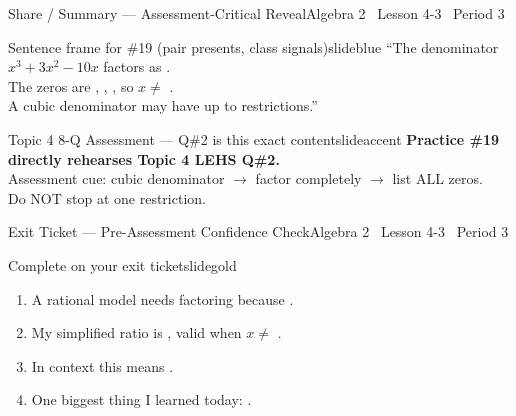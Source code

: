 \documentclass[aspectratio=169, 11pt]{beamer}
\begin{document}
\begin{frame}{Share / Summary --- Assessment-Critical Reveal}{Algebra 2 \textperiodcentered\ Lesson 4-3 \textperiodcentered\ Period 3}
\vspace{0.15cm}
\begin{projcard}{Sentence frame for \#19 (pair presents, class signals)}{slideblue}
``The denominator \(x^3+3x^2-10x\) factors as \underline{\hspace{2.5cm}}.\\
The zeros are \underline{\hspace{1cm}}, \underline{\hspace{1cm}}, \underline{\hspace{1cm}}, so \(x \ne\) \underline{\hspace{2.5cm}}.\\
A cubic denominator may have up to \underline{\hspace{0.6cm}} restrictions.''
\end{projcard}

\vspace{0.15cm}
\begin{projcard}{Topic 4 8-Q Assessment --- Q\#2 is this exact content}{slideaccent}
\textbf{Practice \#19 directly rehearses Topic 4 LEHS Q\#2.}\\
Assessment cue: cubic denominator \(\rightarrow\) factor completely \(\rightarrow\) list ALL zeros.\\
Do NOT stop at one restriction.
\end{projcard}
\end{frame}

\begin{frame}{Exit Ticket --- Pre-Assessment Confidence Check}{Algebra 2 \textperiodcentered\ Lesson 4-3 \textperiodcentered\ Period 3}
\vspace{0.2cm}
\begin{projcard}{Complete on your exit ticket}{slidegold}
\begin{enumerate}
  \setlength{\itemsep}{0.25cm}
  \item A rational model needs factoring because \underline{\hspace{4.5cm}}.
  \item My simplified ratio is \underline{\hspace{2.5cm}}, valid when \(x \ne\) \underline{\hspace{1.5cm}}.
  \item In context this means \underline{\hspace{4.5cm}}.
  \item One biggest thing I learned today: \underline{\hspace{4cm}}.
\end{enumerate}
\end{projcard}
\end{frame}
\end{document}
